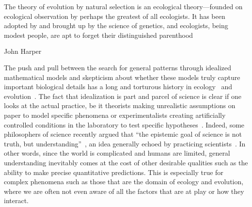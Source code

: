 \epigraph{\justifying The theory of evolution by natural selection is an ecological theory—founded on ecological observation by perhaps the greatest of all ecologists. It has been adopted by and brought up by the science of genetics, and ecologists, being modest people, are apt to forget their distinguished parenthood}{John Harper~\citep{harper_darwinian_1967}}

%
The push and pull between the search for general patterns through idealized mathematical models and skepticism about whether these models truly capture important biological details has a long and torturous history in ecology~\citep{kingsland_modeling_1985} and evolution~\citep{provine_origins_2001}. The fact that idealization is part and parcel of science is clear if one looks at the actual practice, be it theorists making unrealistic assumptions on paper to model specific phenomena or experimentalists creating artificially controlled conditions in the laboratory to test specific hypotheses~\citep{zuk_models_2018}. Indeed, some philosophers of science recently argued that ``the epistemic goal of science is not truth, but understanding''~\citep{potochnik_idealization_2018}, an idea generally echoed by practicing scientists~\citep{levins_strategy_1966,zuk_models_2018,grainger_empiricists_2022}.  In other words, since the world is complicated and humans are limited, general understanding inevitably comes at the cost of other desirable qualities such as the ability to make precise quantitative predictions. This is especially true for complex phenomena such as those that are the domain of ecology and evolution, where we are often not even aware of all the factors that are at play or how they interact.

